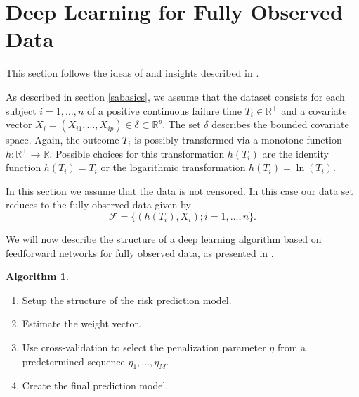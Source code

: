 \documentclass[12pt, a4paper]{article}
\theoremstyle{definition}
\newtheorem{Algorithm}{Algorithm}[section]
\theoremstyle{plain}
\numberwithin{equation}{section}
\numberwithin{figure}{section}
\numberwithin{table}{section}
\begin{document}
	
	
	\newpage
%	
%	
	
	
	\section{Deep Learning for Fully Observed Data} \label{uncensored}
	This section follows the ideas of \citet*{basearticle} and insights described in \citet*{deeplbook}.
	
	As described in section \ref{sabasics}, we assume that the dataset consists for each subject $i = 1,\dots,n$ of a positive continuous failure time $T_i \in \mathbb{R}^+$ and a covariate vector $X_i = (X_{i1}, \dots , X_{ip}) \in \delta \subset \mathbb{R}^p$.
	The set $\delta$ describes the bounded covariate space.
	Again, the outcome $T_i$ is possibly transformed via a monotone function $h: \mathbb{R}^+ \rightarrow \mathbb{R}$.
	Possible choices for this transformation $h(T_i)$ are the identity function $h(T_i)=T_i$ or the logarithmic transformation $h(T_i)= \ln (T_i)$.
	
	In this section we assume that the data is not censored.
	In this case our data set reduces to the fully observed data given by
	\begin{equation*}
	\mathcal{F} =\{ \left( h(T_i), X_i\right); i = 1, \dots, n\}.
	\end{equation*}
	
	We will now describe the structure of a deep learning algorithm based on feedforward networks for fully observed data, as presented in \citet*{basearticle}.
	
	\begin{Algorithm}\label{alg:nocensor}
		~
	\begin{enumerate}
		\item Setup the structure of the risk prediction model.
		\item Estimate the weight vector.
		\item Use cross-validation to select the penalization parameter $\eta$ from a predetermined sequence $\eta_1,\dots,\eta_M$.
		\item Create the final prediction model.
	\end{enumerate}
	\end{Algorithm}
\end{document}
